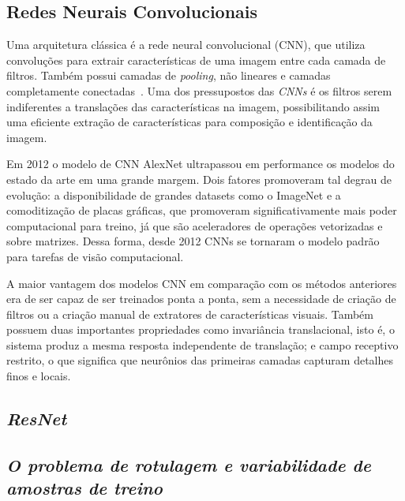 \subsection{Redes Neurais Convolucionais}\label{sec:Cap2_redes_neurais_convolucionais}
Uma arquitetura clássica é a rede neural convolucional (CNN), que utiliza convoluções para extrair características de uma imagem entre cada camada de filtros. Também possui camadas de \textit{pooling}, não lineares e camadas completamente conectadas~\cite{8308186}. Uma dos pressupostos das \textit{CNNs} é os filtros serem indiferentes a translações das características na imagem, possibilitando assim uma eficiente extração de características para composição e identificação da imagem.


Em 2012 o modelo de CNN AlexNet ultrapassou em performance os modelos do estado da arte em uma grande margem. Dois fatores promoveram tal degrau de evolução: a disponibilidade de grandes datasets como o ImageNet e a comoditização de placas gráficas, que promoveram significativamente mais poder computacional para treino, já que são aceleradores de operações vetorizadas e sobre matrizes. Dessa forma, desde 2012 CNNs se tornaram o modelo padrão para tarefas de visão computacional.

A maior vantagem dos modelos CNN em comparação com os métodos anteriores era de ser capaz de ser treinados ponta a ponta, sem a necessidade de criação de filtros ou a criação manual de extratores de características visuais. Também possuem duas importantes propriedades como invariância translacional, isto é, o sistema produz a mesma resposta independente de translação; e campo receptivo restrito, o que significa que neurônios das primeiras camadas capturam detalhes finos e locais.

\subsection{\textit{ResNet}}\label{sec:Cap2_ResNet}

\subsection{\textit{O problema de rotulagem e variabilidade de amostras de treino}}\label{sec:Cap2_rotulagem}

